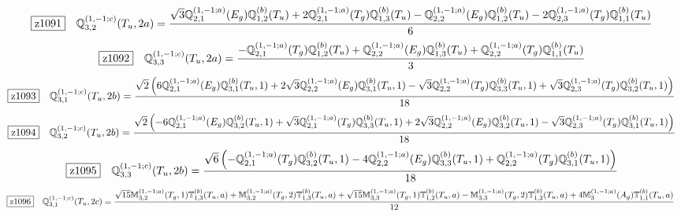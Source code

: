 \documentclass[fleqn,10pt,landscape]{jsarticle}
\begin{document}
\begin{dmath*}
\hspace*{3mm}\fbox{z1091}\quad \mathbb{Q}_{3,2}^{(1,-1;c)}(T_{u},2a)=\frac{\sqrt{3} \mathbb{Q}_{2,1}^{(1,-1;a)}(E_{g}) \mathbb{Q}_{1,2}^{(b)}(T_{u}) + 2 \mathbb{Q}_{2,1}^{(1,-1;a)}(T_{g}) \mathbb{Q}_{1,3}^{(b)}(T_{u}) - \mathbb{Q}_{2,2}^{(1,-1;a)}(E_{g}) \mathbb{Q}_{1,2}^{(b)}(T_{u}) - 2 \mathbb{Q}_{2,3}^{(1,-1;a)}(T_{g}) \mathbb{Q}_{1,1}^{(b)}(T_{u})}{6}
\end{dmath*}
\begin{dmath*}
\hspace*{3mm}\fbox{z1092}\quad \mathbb{Q}_{3,3}^{(1,-1;c)}(T_{u},2a)=\frac{- \mathbb{Q}_{2,1}^{(1,-1;a)}(T_{g}) \mathbb{Q}_{1,2}^{(b)}(T_{u}) + \mathbb{Q}_{2,2}^{(1,-1;a)}(E_{g}) \mathbb{Q}_{1,3}^{(b)}(T_{u}) + \mathbb{Q}_{2,2}^{(1,-1;a)}(T_{g}) \mathbb{Q}_{1,1}^{(b)}(T_{u})}{3}
\end{dmath*}
\begin{dmath*}
\hspace*{3mm}\fbox{z1093}\quad \mathbb{Q}_{3,1}^{(1,-1;c)}(T_{u},2b)=\frac{\sqrt{2} \left(6 \mathbb{Q}_{2,1}^{(1,-1;a)}(E_{g}) \mathbb{Q}_{3,1}^{(b)}(T_{u},1) + 2 \sqrt{3} \mathbb{Q}_{2,2}^{(1,-1;a)}(E_{g}) \mathbb{Q}_{3,1}^{(b)}(T_{u},1) - \sqrt{3} \mathbb{Q}_{2,2}^{(1,-1;a)}(T_{g}) \mathbb{Q}_{3,3}^{(b)}(T_{u},1) + \sqrt{3} \mathbb{Q}_{2,3}^{(1,-1;a)}(T_{g}) \mathbb{Q}_{3,2}^{(b)}(T_{u},1)\right)}{18}
\end{dmath*}
\begin{dmath*}
\hspace*{3mm}\fbox{z1094}\quad \mathbb{Q}_{3,2}^{(1,-1;c)}(T_{u},2b)=\frac{\sqrt{2} \left(- 6 \mathbb{Q}_{2,1}^{(1,-1;a)}(E_{g}) \mathbb{Q}_{3,2}^{(b)}(T_{u},1) + \sqrt{3} \mathbb{Q}_{2,1}^{(1,-1;a)}(T_{g}) \mathbb{Q}_{3,3}^{(b)}(T_{u},1) + 2 \sqrt{3} \mathbb{Q}_{2,2}^{(1,-1;a)}(E_{g}) \mathbb{Q}_{3,2}^{(b)}(T_{u},1) - \sqrt{3} \mathbb{Q}_{2,3}^{(1,-1;a)}(T_{g}) \mathbb{Q}_{3,1}^{(b)}(T_{u},1)\right)}{18}
\end{dmath*}
\begin{dmath*}
\hspace*{3mm}\fbox{z1095}\quad \mathbb{Q}_{3,3}^{(1,-1;c)}(T_{u},2b)=\frac{\sqrt{6} \left(- \mathbb{Q}_{2,1}^{(1,-1;a)}(T_{g}) \mathbb{Q}_{3,2}^{(b)}(T_{u},1) - 4 \mathbb{Q}_{2,2}^{(1,-1;a)}(E_{g}) \mathbb{Q}_{3,3}^{(b)}(T_{u},1) + \mathbb{Q}_{2,2}^{(1,-1;a)}(T_{g}) \mathbb{Q}_{3,1}^{(b)}(T_{u},1)\right)}{18}
\end{dmath*}
\begin{dmath*}
\hspace*{3mm}\fbox{z1096}\quad \mathbb{Q}_{3,1}^{(1,-1;c)}(T_{u},2c)=\frac{\sqrt{15} \mathbb{M}_{3,2}^{(1,-1;a)}(T_{g},1) \mathbb{T}_{1,3}^{(b)}(T_{u},a) + \mathbb{M}_{3,2}^{(1,-1;a)}(T_{g},2) \mathbb{T}_{1,3}^{(b)}(T_{u},a) + \sqrt{15} \mathbb{M}_{3,3}^{(1,-1;a)}(T_{g},1) \mathbb{T}_{1,2}^{(b)}(T_{u},a) - \mathbb{M}_{3,3}^{(1,-1;a)}(T_{g},2) \mathbb{T}_{1,2}^{(b)}(T_{u},a) + 4 \mathbb{M}_{3}^{(1,-1;a)}(A_{g}) \mathbb{T}_{1,1}^{(b)}(T_{u},a)}{12}
\end{dmath*}
\end{document}
